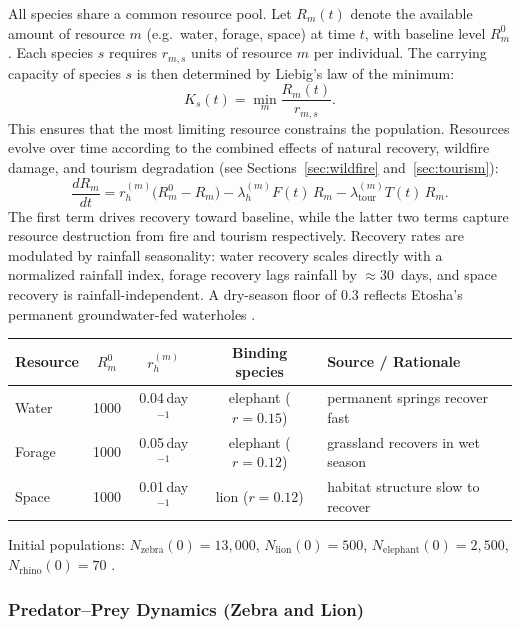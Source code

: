 All species share a common resource pool. Let $R_m(t)$ denote the available amount of resource $m$ (e.g.\ water, forage, space) at time $t$, with baseline level $R_m^0$. Each species $s$ requires $r_{m,s}$ units of resource $m$ per individual. The carrying capacity of species $s$ is then determined by Liebig's law of the minimum:
\[
K_s(t) = \min_m \frac{R_m(t)}{r_{m,s}}.
\]
This ensures that the most limiting resource constrains the population. Resources evolve over time according to the combined effects of natural recovery, wildfire damage, and tourism degradation (see Sections~\ref{sec:wildfire} and~\ref{sec:tourism}):
\[
\frac{dR_m}{dt} = r_h^{(m)}\bigl(R_m^0 - R_m\bigr) - \lambda_h^{(m)} F(t)\,R_m - \lambda_{\text{tour}}^{(m)} T(t)\,R_m.
\]
The first term drives recovery toward baseline, while the latter two terms capture resource destruction from fire and tourism respectively. Recovery rates are modulated by rainfall seasonality: water recovery scales directly with a normalized rainfall index, forage recovery lags rainfall by $\approx 30$~days, and space recovery is rainfall-independent. A dry-season floor of $0.3$ reflects Etosha's permanent groundwater-fed waterholes \cite{craig2015etosha}.

\begin{center}
\begin{tabular}{l c c c l}
\hline
\textbf{Resource} & $R_m^0$ & $r_h^{(m)}$ & \textbf{Binding species} & \textbf{Source / Rationale} \\
\hline
Water & 1000 & 0.04\,day$^{-1}$ & elephant ($r = 0.15$) & permanent springs recover fast \\
Forage & 1000 & 0.05\,day$^{-1}$ & elephant ($r = 0.12$) & grassland recovers in wet season \\
Space & 1000 & 0.01\,day$^{-1}$ & lion ($r = 0.12$) & habitat structure slow to recover \\
\hline
\end{tabular}
\end{center}

Initial populations: $N_{\text{zebra}}(0) = 13{,}000$, $N_{\text{lion}}(0) = 500$, $N_{\text{elephant}}(0) = 2{,}500$, $N_{\text{rhino}}(0) = 70$ \cite{craig2015etosha}.

\subsubsection{Predator--Prey Dynamics (Zebra and Lion)}

